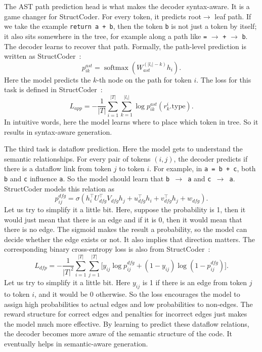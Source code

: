 \documentclass[12pt]{article}
\begin{document}
The AST path prediction head is what makes the decoder syntax-aware. It is a game changer for StructCoder. For every token, it predicts root$\rightarrow$ leaf path. \@ If we take the example \texttt{return a + b}, then the token \texttt{b} is not just a token by itself; it also sits somewhere in the tree, for example along a path like \texttt{=} $\rightarrow$ \texttt{+} $\rightarrow$ \texttt{b}. The decoder learns to recover that path. Formally, the path-level prediction is written as StructCoder~\cite{10.1145/3636430}:
\begin{equation}
p^{ast}_{ik} = \operatorname{softmax}\!\left(W^{( |l_i|-k )}_{ast} h_i\right).
\end{equation}
Here the model predicts the $k$-th node on the path for token $i$. The loss for this task is defined in StructCoder~\cite{10.1145/3636430}:
\begin{equation}
L_{app} = -\frac{1}{|T|} \sum_{i=1}^{|T|} \sum_{k=1}^{|l_i|} \log p^{ast}_{ik}(r_k^i.\mathrm{type}).
\end{equation}
In intuitive words, here the model learns where to place which token in tree. So it results in syntax-aware generation.

The third task is dataflow prediction. Here the model gets to understand the semantic relationships. For every pair of tokens $(i, j)$, the decoder predicts if there is a dataflow link from token $j$ to token $i$. For example, in \texttt{a = b + c}, both \texttt{b} and \texttt{c} influence \texttt{a}. So the model should learn that \texttt{b $\rightarrow$ a} and \texttt{c $\rightarrow$ a}. StructCoder models this relation as
\begin{equation}
p^{dfg}_{ij} = \sigma\!\left(h_i^{\top} U_{dfg}^{\top} V_{dfg} h_j + u_{dfg}^{\top} h_i + v_{dfg}^{\top} h_j + w_{dfg}\right).
\end{equation}
Let us try to simplify it a little bit. Here, suppose the probability is 1, then it would just mean that there is an edge and if it is 0, then it would mean that there is no edge.
The sigmoid makes the result a probability, so the model can decide whether the edge exists or not. It also implies that direction matters. The corresponding binary cross-entropy loss is also from StructCoder~\cite{10.1145/3636430}:
\begin{equation}
L_{dfp} = -\frac{1}{|T|^2} \sum_{i=1}^{|T|} \sum_{j=1}^{|T|} \Big[y_{ij} \log p^{dfg}_{ij} + (1-y_{ij}) \log(1-p^{dfg}_{ij})\Big].
\end{equation}
Let us try to simplify it a little bit. Here $y_{ij}$ is 1 if there is an edge from token $j$ to token $i$, and it would be 0 otherwise. So the loss encourages the model to assign high probabilities to actual edges and low probabilities to non-edges. The reward structure for correct edges and penalties for incorrect edges just makes the model much more effective. By learning to predict these dataflow relations, the decoder becomes more aware of the semantic structure of the code.
It eventually helps in semantic-aware generation.
\end{document}
